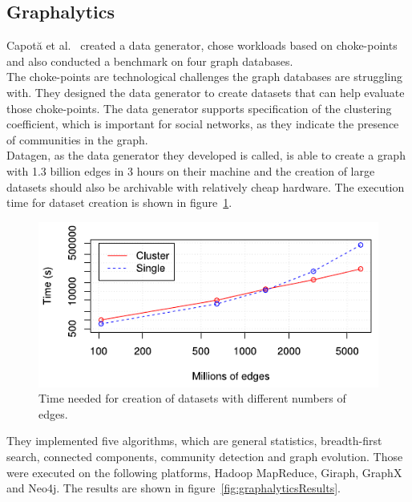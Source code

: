 \subsection{Graphalytics}
Capot\u a et al.~\cite{Capota2015} created a data generator, chose workloads based on choke-points and also conducted a benchmark on four graph databases.\\
The choke-points are technological challenges the graph databases are struggling with.
They designed the data generator to create datasets that can help evaluate those choke-points.
The data generator supports specification of the clustering coefficient,
which is important for social networks,
as they indicate the presence of communities in the graph.\\
Datagen, as the data generator they developed is called,
is able to create a graph with 1.3 billion edges in 3 hours on their machine and the creation of large datasets should also be archivable with relatively cheap hardware.
The execution time for dataset creation is shown in figure~\ref{fig:graphalyticsDataset}.

\begin{figure}[h!]
  \centering
  \includegraphics[width=.75\textwidth]{images/benchmarks/GraphalyticsDataset}
  \caption{Time needed for creation of datasets with different numbers of edges.~\cite{Capota2015}}
  \label{fig:graphalyticsDataset}
\end{figure}

They implemented five algorithms,
which are general statistics, breadth-first search, connected components, community detection and graph evolution.
Those were executed on the following platforms,
Hadoop MapReduce, Giraph, GraphX and Neo4j.
The results are shown in figure~\ref{fig:graphalyticsResults}.

